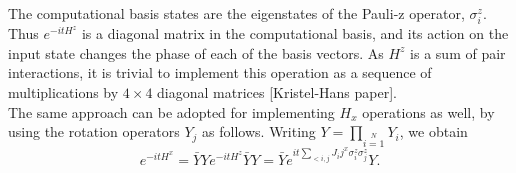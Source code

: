 \documentclass[12]{article}
\begin{document}
The computational basis states are the eigenstates of the Pauli-z operator, $\sigma_i^z$. Thus $e^{-itH^z}$ is a diagonal matrix in the computational basis, and its action on the input state changes the phase of each of the basis vectors. As $H^z$ is a sum of pair interactions, it is trivial to implement this operation as a sequence of multiplications by $4 \times 4$ diagonal matrices [Kristel-Hans paper].\\

The same approach can be adopted for implementing $H_x$ operations as well, by using the rotation operators $Y_j$ as follows. Writing $Y=\prod \limits_{i=1} \limits^{N} Y_i$, we obtain
\begin{equation}
e^{-itH^x}=\bar{Y}Y e^{-itH^z}\bar{Y}Y=\bar{Y}e^{it \sum \limits_{<i,j} J_ij^x \sigma_i^z \sigma_j^z} Y.
\end{equation}
\end{document}
